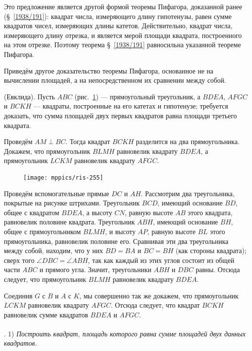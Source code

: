 \documentclass[oneside]{book}
\begin{document}
Это предложение является другой формой теоремы Пифагора, доказанной ранее (§~\ref{1938/191}):
квадрат числа, измеряющего длину гипотенузы, равен сумме квадратов чисел, измеряющих длины катетов.
Действительно, квадрат числа, измеряющего длину отрезка, и является мерой площади квадрата, построенного на этом отрезке.
Поэтому теорема §~\ref{1938/191} равносильна указанной теореме Пифагора.

Приведём другое доказательство теоремы Пифагора, основанное не на вычислении площадей, а на непосредственном их сравнении между собой.

\smallskip
\mbox{} (Евклида).
Пусть $ABC$ (рис.~\ref{1938/ris-255}) — прямоугольный треугольник, а $BDEA$, $AFGC$ и $BCKH$ — квадраты, построенные на его катетах и гипотенузе;
требуется доказать, что сумма площадей двух первых квадратов равна площади третьего квадрата.

Проведём $AM\perp BC$.
Тогда квадрат $BCKH$ разделится на два прямоугольника.
Докажем, что прямоугольник $BLMH$ равновелик квадрату $BDEA$, а прямоугольник $LCKM$ равновелик квадрату $AFGC$.

\begin{figure}
\centering
\texttt{[image: mppics/ris-255]}
\caption{}\label{1938/ris-255}
\end{figure}

Проведём вспомогательные прямые $DC$ и $AH$.
Рассмотрим два треугольника, покрытые на рисунке штрихами.
Треугольник $BCD$, имеющий основание $BD$, общее с квадратом $BDEA$, а высоту $CN$, 
равную высоте $AB$ этого квадрата, равновелик половине квадрата.
Треугольник $ABH$, имеющий основание $BH$, общее с прямоугольником $BLMH$, и высоту $AP$, 
равную высоте $BL$ этого прямоугольника, равновелик половине его.
Сравнивая эти два треугольника между собой, находим, что у них $BD = BA$ и $BC=BH$ (как стороны квадрата);
сверх того $\angle DBC=\angle ABH$, так как каждый из этих углов состоит из общей части $ABC$ и прямого угла.
Значит, треугольники $ABH$ и $DBC$ равны.
Отсюда следует, что прямоугольник $BLMH$ равновелик квадрату $BDEA$.

Соединив $G$ с $B$ и $A$ с $K$, мы совершенно так же докажем, что прямоугольник $LCKM$ равновелик квадрату $AFGC$.
Отсюда следует, что квадрат $BCKH$ равновелик сумме квадратов $BDEA$ и $AFGC$.


\paragraph{}\label{1938/258}
.
1) \emph{Построить квадрат, площадь которого равна сумме площадей двух данных квадратов.}
\end{document}
